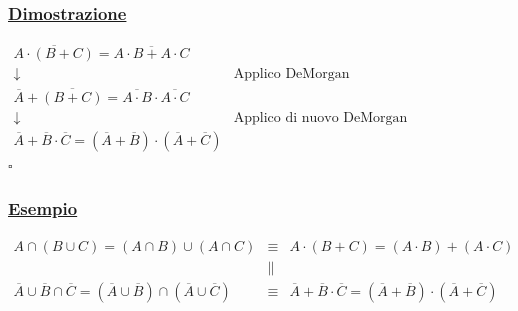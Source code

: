 \documentclass{article}
\begin{document}
\subsubsection{\underline{Dimostrazione}}
$\begin{matrix}
\overline{A \cdot (B+C)} = \overline{A \cdot B + A \cdot C} & \\
\downarrow & \text{Applico DeMorgan} \\
\overline{A} + \overline{(B+C)} = \overline{A \cdot B} \cdot \overline{A \cdot C} & \\
\downarrow & \text{Applico di nuovo DeMorgan} \\
\overline{A} + \overline{B} \cdot \overline{C} = \left(\overline{A} + \overline{B} \right) \cdot \left( \overline{A} + \overline{C} \right)
\end{matrix}$ \\
\hspace*{0pt}\hfill $\square$ 
\subsubsection{\underline{Esempio}}
$\begin{matrix}
A \cap (B \cup C) = (A \cap B) \cup (A \cap C) & \equiv & A \cdot (B + C) = (A \cdot B) + (A \cdot C) \\
& \parallel & \\
\overline{A} \cup \overline{B} \cap \overline{C} = \left( \overline{A} \cup \overline{B} \right) \cap \left( \overline{A} \cup \overline{C} \right) & \equiv & 
\overline{A} + \overline{B} \cdot \overline{C} = \left( \overline{A} + \overline{B} \right) \cdot \left( \overline{A} + \overline{C} \right)
\end{matrix}$
\end{document}
